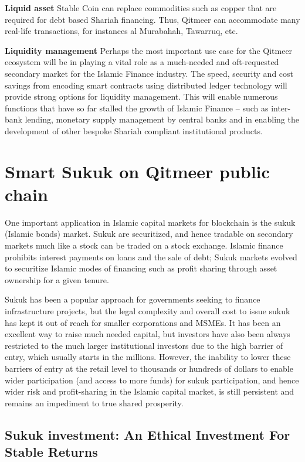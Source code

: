 \documentclass[a4paper,11pt]{article}
\begin{document}
\textbf{Liquid asset} 
Stable Coin can replace commodities such as copper that are required for debt based Shariah financing. Thus, Qitmeer can accommodate many real-life transactions, for instances al Murabahah, Tawarruq, etc. 

\textbf{Liquidity management}  
Perhaps the most important use case for the Qitmeer ecosystem will be in playing a vital role as a much-needed and oft-requested secondary market for the Islamic Finance industry. The speed, security and cost savings from encoding smart contracts using distributed ledger technology will provide strong options for liquidity management. This will enable numerous functions that have so far stalled the growth of Islamic Finance – such as inter-bank lending, monetary supply management by central banks and in enabling the development of other bespoke Shariah compliant institutional products.

\section{Smart Sukuk on Qitmeer public chain}

One important application in Islamic capital markets for blockchain is the sukuk (Islamic bonds) market. Sukuk are securitized, and hence tradable on secondary markets much like a stock can be traded on a stock exchange. Islamic finance prohibits interest payments on loans and the sale of debt; Sukuk markets evolved to securitize Islamic modes of financing such as profit sharing through asset ownership for a given tenure.

Sukuk has been a popular approach for governments seeking to finance infrastructure projects, but the legal complexity and overall cost to issue sukuk has kept it out of reach for smaller corporations and MSMEs. It has been an excellent way to raise much needed capital, but investors have also been always restricted to the much larger institutional investors due to the high barrier of entry, which usually starts in the millions. However, the inability to lower these barriers of entry at the retail level to thousands or hundreds of dollars to enable wider participation (and access to more funds) for sukuk participation, and hence wider risk and profit-sharing in the Islamic capital market, is still persistent and remains an impediment to true shared prosperity.

\subsection{Sukuk investment: An Ethical Investment For  Stable  Returns}
\end{document}
